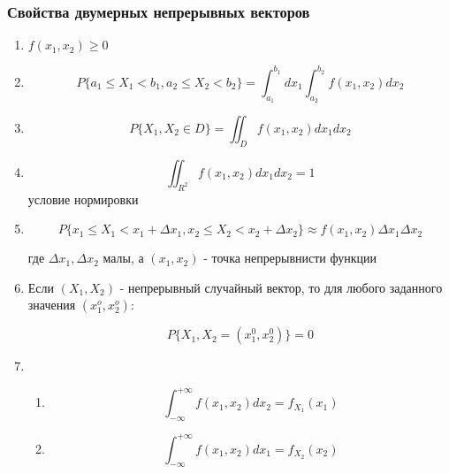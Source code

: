 \documentclass[a4paper, 14pt]{report}
\begin{document}
\subsubsection{Свойства двумерных непрерывных векторов}

\begin{enumerate}
    \item $f(x_1, x_2) \geq 0$
    \item $$P\{ a_1 \le X_1 < b_1, a_2 \le X_2 < b_2 \} = \int_{a_1}^{b_1} dx_1 \int_{a_2}^{b_2} f(x_1, x_2) dx_2$$

    \item $$P\{X_1,X_2 \in D\} = \iint_D f(x_1, x_2)dx_1dx_2$$
    \item $$\iint_{R^2} f(x_1, x_2) dx_1dx_2 = 1$$ условие нормировки
    \item $$P\{ x_1 \le X_1 < x_1 + \Delta x_1, x_2 \le X_2 < x_2 + \Delta x_2 \} \approx f(x_1, x_2)\Delta x_1 \Delta x_2$$

        где $\Delta x_1, \Delta x_2$ малы, а $(x_1, x_2)$ - точка непрерывнисти функции

    \item Если $(X_1, X_2)$ - непрерывный случайный вектор, то для любого заданного значения $(x_1^o, x_2^o)$:

        $$
        P\{X_1, X_2 = (x_1^0, x_2^0)\} = 0
        $$

    \item

        \begin{enumerate}
            \item

                $$
                \int_{-\infty}^{+\infty} f(x_1, x_2)dx_2 = f_{X_1}(x_1)
                $$

            \item

                $$
                \int_{-\infty}^{+\infty} f(x_1, x_2)dx_1 = f_{X_2}(x_2)
                $$
        \end{enumerate}
\end{enumerate}
\end{document}
